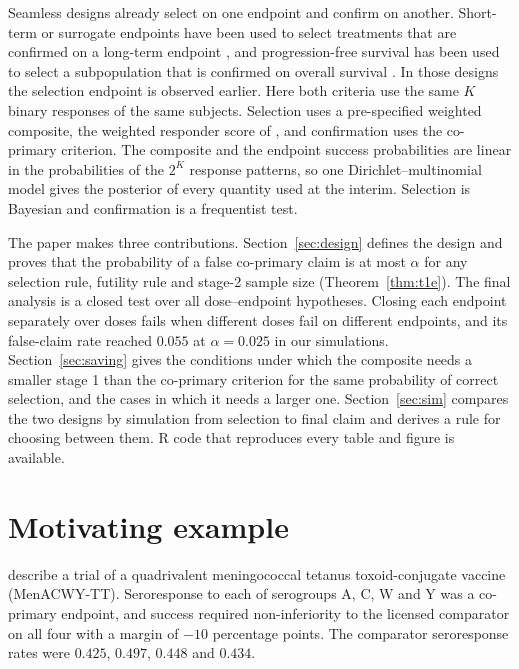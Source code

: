 Seamless designs already select on one endpoint and confirm on another. Short-term or surrogate endpoints have been used to select treatments that are confirmed on a long-term endpoint \citep{stallard2010,friede2011,kunz2014}, and progression-free survival has been used to select a subpopulation that is confirmed on overall survival \citep{jenkins2011}. In those designs the selection endpoint is observed earlier. Here both criteria use the same $K$ binary responses of the same subjects. Selection uses a pre-specified weighted composite, the weighted responder score of \citet{zaslavsky2013}, and confirmation uses the co-primary criterion. The composite and the endpoint success probabilities are linear in the probabilities of the $2^K$ response patterns, so one Dirichlet--multinomial model \citep{thall1995,yang2024} gives the posterior of every quantity used at the interim. Selection is Bayesian and confirmation is a frequentist test.

The paper makes three contributions. Section~\ref{sec:design} defines the design and proves that the probability of a false co-primary claim is at most $\alpha$ for any selection rule, futility rule and stage-2 sample size (Theorem~\ref{thm:t1e}). The final analysis is a closed test over all dose--endpoint hypotheses. Closing each endpoint separately over doses fails when different doses fail on different endpoints, and its false-claim rate reached $0.055$ at $\alpha=0.025$ in our simulations. Section~\ref{sec:saving} gives the conditions under which the composite needs a smaller stage 1 than the co-primary criterion for the same probability of correct selection, and the cases in which it needs a larger one. Section~\ref{sec:sim} compares the two designs by simulation from selection to final claim and derives a rule for choosing between them. R code that reproduces every table and figure is available.

\section{Motivating example}\label{sec:motivation}

\citet{yang2024} describe a trial of a quadrivalent meningococcal tetanus toxoid-conjugate vaccine (MenACWY-TT). Seroresponse to each of serogroups A, C, W and Y was a co-primary endpoint, and success required non-inferiority to the licensed comparator on all four with a margin of $-10$ percentage points. The comparator seroresponse rates were $0.425$, $0.497$, $0.448$ and $0.434$.


